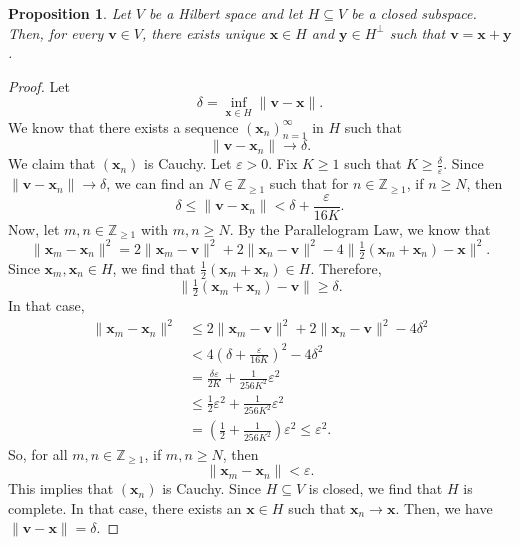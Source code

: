\documentclass[a4paper, openany]{memoir}
\theoremstyle{definition}
\theoremstyle{plain}
\newtheorem{proposition}[definition]{Proposition}
\begin{document}
    \begin{proposition}
        Let $V$ be a Hilbert space and let $H \subseteq V$ be a closed subspace. Then, for every $\bm{v} \in V$, there exists unique $\bm{x} \in H$ and $\bm{y} \in H^\perp$ such that $\bm{v} = \bm{x} + \bm{y}$.
    \end{proposition}
    \begin{proof}
        Let
        \[\delta = \inf_{\bm{x} \in H} \lVert \bm{v} - \bm{x} \rVert.\]
        We know that there exists a sequence $(\bm{x}_n)_{n=1}^\infty$ in $H$ such that
        \[\lVert \bm{v} - \bm{x}_n \rVert \to \delta.\]
        We claim that $(\bm{x}_n)$ is Cauchy. Let $\varepsilon > 0$. Fix $K \geq 1$ such that $K \geq \frac{\delta}{\varepsilon} $. Since $\lVert \bm{v} - \bm{x}_n \rVert \to \delta$, we can find an $N \in \mathbb{Z}_{\geq 1}$ such that for $n \in \mathbb{Z}_{\geq 1}$, if $n \geq N$, then 
        \[\delta \leq \lVert \bm{v} - \bm{x}_n \rVert < \delta + \frac{\varepsilon}{16K}.\]
        Now, let $m, n \in \mathbb{Z}_{\geq 1}$ with $m, n \geq N$. By the Parallelogram Law, we know that
        \[\lVert \bm{x}_m - \bm{x}_n \rVert^2 = 2 \lVert \bm{x}_m - \bm{v} \rVert^2 + 2\lVert \bm{x}_n - \bm{v} \rVert^2 - 4 \lVert \tfrac{1}{2} (\bm{x}_m + \bm{x}_n) - \bm{x} \rVert^2.\]
        Since $\bm{x}_m, \bm{x}_n \in H$, we find that $\frac{1}{2}(\bm{x}_m + \bm{x}_n) \in H$. Therefore,
        \[\lVert \tfrac{1}{2} (\bm{x}_m + \bm{x}_n) - \bm{v} \rVert \geq \delta.\]
        In that case,
        \begin{align*}
            \lVert \bm{x}_m - \bm{x}_n \rVert^2 &\leq  2 \lVert \bm{x}_m - \bm{v} \rVert^2 + 2\lVert \bm{x}_n - \bm{v} \rVert^2 - 4\delta^2 \\
            &< 4 \left(\delta + \frac{\varepsilon}{16K}\right)^2 - 4\delta^2 \\
            &= \frac{\delta \varepsilon}{2K} + \frac{1}{256K^2} \varepsilon^2 \\
            &\leq \frac{1}{2} \varepsilon^2 + \frac{1}{256K^2} \varepsilon^2 \\
            &= \left(\frac{1}{2} + \frac{1}{256K^2}\right) \varepsilon^2 \leq \varepsilon^2.
        \end{align*}
        So, for all $m, n \in \mathbb{Z}_{\geq 1}$, if $m, n \geq N$, then
        \[\lVert \bm{x}_m - \bm{x}_n \rVert < \varepsilon.\]
        This implies that $(\bm{x}_n)$ is Cauchy. Since $H \subseteq V$ is closed, we find that $H$ is complete. In that case, there exists an $\bm{x} \in H$ such that $\bm{x}_n \to \bm{x}$. Then, we have $\lVert \bm{v} - \bm{x} \rVert = \delta$.


\end{proof}
\end{document}
